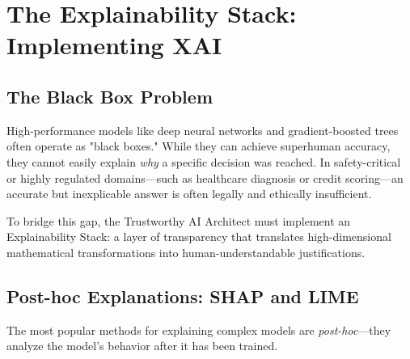 
\chapter{The Explainability Stack: Implementing XAI}
\label{chap:explainability_stack}


\section{The Black Box Problem}
\label{sec:black_box}

High-performance models like deep neural networks and gradient-boosted trees often operate as "black boxes." While they can achieve superhuman accuracy, they cannot easily explain \textit{why} a specific decision was reached. In safety-critical or highly regulated domains---such as healthcare diagnosis or credit scoring---an accurate but inexplicable answer is often legally and ethically insufficient.

To bridge this gap, the Trustworthy AI Architect must implement an Explainability Stack: a layer of transparency that translates high-dimensional mathematical transformations into human-understandable justifications.

\section{Post-hoc Explanations: SHAP and LIME}
\label{sec:xai_methods}

The most popular methods for explaining complex models are \textit{post-hoc}---they analyze the model's behavior after it has been trained.

